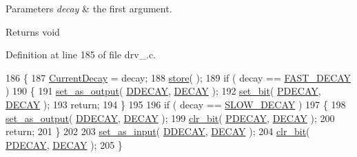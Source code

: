\begin{DoxyParams}{Parameters}
{\em decay} & the first argument. \\
\hline
\end{DoxyParams}
\begin{DoxyReturn}{Returns}
void 
\end{DoxyReturn}


Definition at line 185 of file drv\-\_.\-c.


\begin{DoxyCode}
186 \{
187     \hyperlink{drv__8825_8c_a1cc7e950196402ba79f3e5098b08fa33}{CurrentDecay} = decay;
188     \hyperlink{group__biba__drv_gaaefaac2ed4c54f2008d8d236392c7261}{store}( );
189     \textcolor{keywordflow}{if} ( decay == \hyperlink{group__biba__drv_ggafe05744bd777532cf059c0d7293a7ab8af9716e06b54f75cbd7dedc154a7d49e2}{FAST\_DECAY} )
190     \{
191         \hyperlink{group__biba__config_ga91fb0adcf6533b4acfe793396836badc}{set\_as\_output}( \hyperlink{group__biba__config_ga4280725e4eff1145eac3e34c574b8383}{DDECAY}, \hyperlink{group__biba__config_ga9d211c41bcae2aa62028a3645c63cf8a}{DECAY} );
192         \hyperlink{group__biba__config_ga4ee07d04aa2ef10d631d61c17c558464}{set\_bit}( \hyperlink{group__biba__config_ga42a58bd5ca7d52e02b78dbc498bd18fc}{PDECAY}, \hyperlink{group__biba__config_ga9d211c41bcae2aa62028a3645c63cf8a}{DECAY} );
193         \textcolor{keywordflow}{return};
194     \}
195 
196     \textcolor{keywordflow}{if} ( decay == \hyperlink{group__biba__drv_ggafe05744bd777532cf059c0d7293a7ab8a05f6a902065ce2f3355101cf657f4ba4}{SLOW\_DECAY} )
197     \{
198         \hyperlink{group__biba__config_ga91fb0adcf6533b4acfe793396836badc}{set\_as\_output}( \hyperlink{group__biba__config_ga4280725e4eff1145eac3e34c574b8383}{DDECAY}, \hyperlink{group__biba__config_ga9d211c41bcae2aa62028a3645c63cf8a}{DECAY} );
199         \hyperlink{group__biba__config_gaf2f231c38a29a96bac24f174fe7bf8b0}{clr\_bit}( \hyperlink{group__biba__config_ga42a58bd5ca7d52e02b78dbc498bd18fc}{PDECAY}, \hyperlink{group__biba__config_ga9d211c41bcae2aa62028a3645c63cf8a}{DECAY} );
200         \textcolor{keywordflow}{return};
201     \}
202 
203     \hyperlink{group__biba__config_gaf5147cefc7b56baad8c6337a315ce07f}{set\_as\_input}( \hyperlink{group__biba__config_ga4280725e4eff1145eac3e34c574b8383}{DDECAY}, \hyperlink{group__biba__config_ga9d211c41bcae2aa62028a3645c63cf8a}{DECAY} );
204     \hyperlink{group__biba__config_gaf2f231c38a29a96bac24f174fe7bf8b0}{clr\_bit}( \hyperlink{group__biba__config_ga42a58bd5ca7d52e02b78dbc498bd18fc}{PDECAY}, \hyperlink{group__biba__config_ga9d211c41bcae2aa62028a3645c63cf8a}{DECAY} );
205 \}
\end{DoxyCode}


